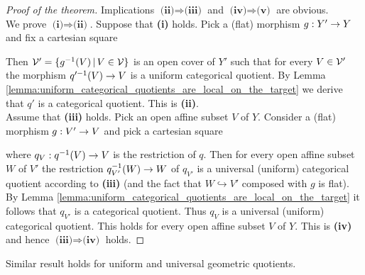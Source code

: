 \begin{proof}[Proof of the theorem]
Implications $\textbf{(ii)}\Rightarrow \textbf{(iii)}$ and $\textbf{(iv)}\Rightarrow \textbf{(v)}$ are obvious.\\
We prove $\textbf{(i)}\Rightarrow \textbf{(ii)}$. Suppose that \textbf{(i)} holds. Pick a (flat) morphism $g:Y'\rightarrow Y$ and fix a cartesian square
\begin{center}
\end{center}
Then ${\mathcal V}' = \{g^{-1}(V)\,|\,V\in {\mathcal V}\}$ is an open cover of $Y'$ such that for every $V\in {\mathcal V}'$ the morphism $q'^{-1}(V)\rightarrow V$ is a uniform categorical quotient. By Lemma \ref{lemma:uniform_categorical_quotients_are_local_on_the_target} we derive that $q'$ is a categorical quotient. This is \textbf{(ii)}.\\
Assume that \textbf{(iii)} holds. Pick an open affine subset $V$ of $Y$. Consider a (flat) morphism $g:V'\rightarrow V$ and pick a cartesian square 
\begin{center}
\end{center} 
where $q_V:q^{-1}(V)\rightarrow V$ is the restriction of $q$. Then for every open affine subset $W$ of $V'$ the restriction ${q}_{V'}^{-1}(W)\rightarrow W$ of $q_{V'}$ is a universal (uniform) categorical quotient according to \textbf{(iii)} (and the fact that $W\hookrightarrow V'$ composed with $g$ is flat). By Lemma \ref{lemma:uniform_categorical_quotients_are_local_on_the_target} it follows that $q_{V'}$ is a categorical quotient. Thus $q_V$ is a universal (uniform) categorical quotient. This holds for every open affine subset $V$ of $Y$. This is \textbf{(iv)} and hence $\textbf{(iii)}\Rightarrow \textbf{(iv)}$ holds.
\end{proof}
\noindent
Similar result holds for uniform and universal geometric quotients.

